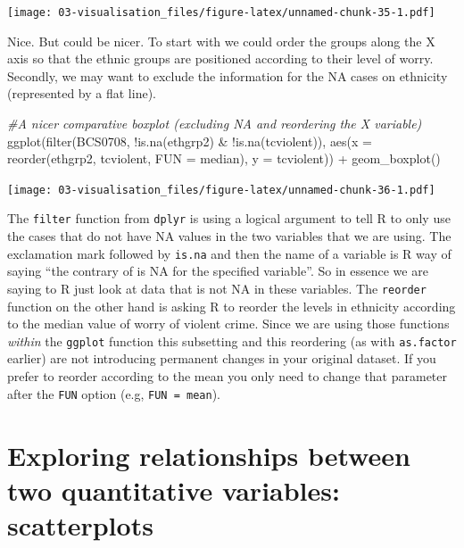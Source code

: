 \documentclass[
]{book}
\newenvironment{Shaded}{\begin{snugshade}}{\end{snugshade}}
\newcommand{\AttributeTok}[1]{\textcolor[rgb]{0.77,0.63,0.00}{#1}}
\newcommand{\CommentTok}[1]{\textcolor[rgb]{0.56,0.35,0.01}{\textit{#1}}}
\newcommand{\FunctionTok}[1]{\textcolor[rgb]{0.00,0.00,0.00}{#1}}
\newcommand{\NormalTok}[1]{#1}
\newcommand{\SpecialCharTok}[1]{\textcolor[rgb]{0.00,0.00,0.00}{#1}}
\begin{document}
\texttt{[image: 03-visualisation\_files/figure-latex/unnamed-chunk-35-1.pdf]}

Nice. But could be nicer. To start with we could order the groups along the X axis so that the ethnic groups are positioned according to their level of worry. Secondly, we may want to exclude the information for the NA cases on ethnicity (represented by a flat line).

\begin{Shaded}
\begin{Highlighting}[]
\CommentTok{\#A nicer comparative boxplot (excluding NA and reordering the X variable)}
\FunctionTok{ggplot}\NormalTok{(}\FunctionTok{filter}\NormalTok{(BCS0708, }\SpecialCharTok{!}\FunctionTok{is.na}\NormalTok{(ethgrp2) }\SpecialCharTok{\&} \SpecialCharTok{!}\FunctionTok{is.na}\NormalTok{(tcviolent)), }
       \FunctionTok{aes}\NormalTok{(}\AttributeTok{x =} \FunctionTok{reorder}\NormalTok{(ethgrp2, tcviolent, }\AttributeTok{FUN =}\NormalTok{ median), }\AttributeTok{y =}\NormalTok{ tcviolent)) }\SpecialCharTok{+}
        \FunctionTok{geom\_boxplot}\NormalTok{()}
\end{Highlighting}
\end{Shaded}

\texttt{[image: 03-visualisation\_files/figure-latex/unnamed-chunk-36-1.pdf]}

The \texttt{filter} function from \texttt{dplyr} is using a logical argument to tell R to only use the cases that do not have NA values in the two variables that we are using. The exclamation mark followed by \texttt{is.na} and then the name of a variable is R way of saying ``the contrary of is NA for the specified variable''. So in essence we are saying to R just look at data that is not NA in these variables. The \texttt{reorder} function on the other hand is asking R to reorder the levels in ethnicity according to the median value of worry of violent crime. Since we are using those functions \emph{within} the \texttt{ggplot} function this subsetting and this reordering (as with \texttt{as.factor} earlier) are not introducing permanent changes in your original dataset. If you prefer to reorder according to the mean you only need to change that parameter after the \texttt{FUN} option (e.g, \texttt{FUN\ =\ mean}).

\hypertarget{exploring-relationships-between-two-quantitative-variables-scatterplots}{%
\section{Exploring relationships between two quantitative variables: scatterplots}\label{exploring-relationships-between-two-quantitative-variables-scatterplots}}
\end{document}
